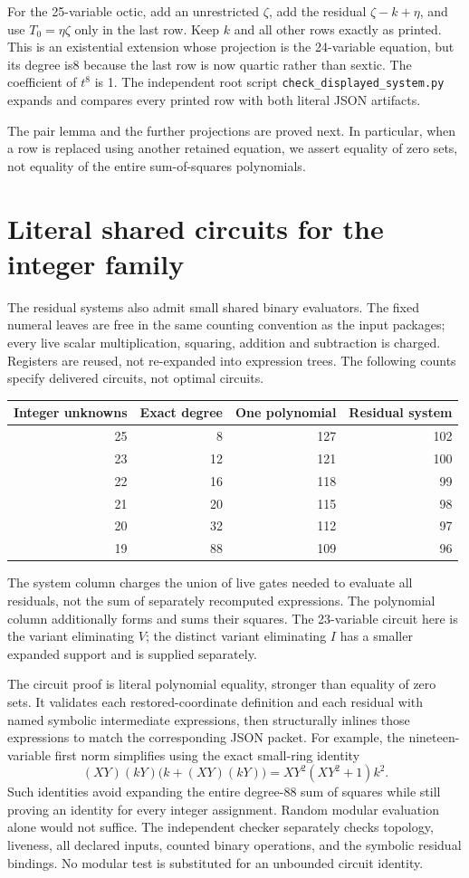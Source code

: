 \documentclass[11pt]{article}
\begin{document}
For the 25-variable octic, add an unrestricted $\zeta$, add the residual
$\zeta-k+\eta$, and use $T_0=\eta\zeta$ only in the last row. Keep $k$ and
all other rows exactly as printed. This is an existential extension whose
projection is the 24-variable equation, but its degree is8 because the last
row is now quartic rather than sextic. The coefficient of $t^8$ is 1.
The independent root script \texttt{check\_displayed\_system.py} expands
and compares every printed row with both literal JSON artifacts.

The pair lemma and the further projections are proved next. In particular,
when a row is replaced using another retained equation, we assert equality
of zero sets, not equality of the entire sum-of-squares polynomials.


\section{Literal shared circuits for the integer family}
The residual systems also admit small shared binary evaluators. The fixed
numeral leaves are free in the same counting convention as the input
packages; every live scalar multiplication, squaring, addition and subtraction
is charged. Registers are reused, not re-expanded into expression trees.
The following counts specify delivered circuits, not optimal circuits.
\begin{center}
\begin{tabular}{rrrr}
\toprule
Integer unknowns & Exact degree & One polynomial & Residual system\\
\midrule
25&8&127&102\\
23&12&121&100\\
22&16&118&99\\
21&20&115&98\\
20&32&112&97\\
19&88&109&96\\
\bottomrule
\end{tabular}
\end{center}
The system column charges the union of live gates needed to evaluate all
residuals, not the sum of separately recomputed expressions. The polynomial
column additionally forms and sums their squares. The 23-variable circuit
here is the variant eliminating $V$; the distinct variant eliminating $I$
has a smaller expanded support and is supplied separately.

The circuit proof is literal polynomial equality, stronger than equality
of zero sets. It validates each restored-coordinate definition and each
residual with named symbolic intermediate expressions, then structurally
inlines those expressions to match the corresponding JSON packet.
For example, the nineteen-variable first norm simplifies using the exact
small-ring identity
\[
 (XY)(kY)\bigl(k+(XY)(kY)\bigr)
 =XY^2(XY^2+1)k^2.
\]
Such identities avoid expanding the entire degree-88 sum of squares while
still proving an identity for every integer assignment. Random modular
evaluation alone would not suffice. The independent checker separately
checks topology, liveness, all declared inputs, counted binary operations,
and the symbolic residual bindings. No modular test is substituted for
an unbounded circuit identity.
\end{document}
